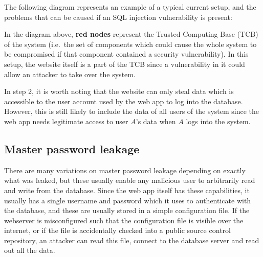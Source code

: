 \documentclass{report}
\begin{document}
The following diagram represents an example of a typical current setup, and the problems that can be caused if an SQL injection vulnerability is present:

\begin{center}
\end{center}

In the diagram above, \textbf{red nodes} represent the Trusted Computing Base (TCB) of the system (i.e.\ the set of components which could cause the whole system to be compromised if that component contained a security vulnerability). In this setup, the website itself is a part of the TCB since a vulnerability in it could allow an attacker to take over the system.

In step 2, it is worth noting that the website can only steal data which is accessible to the user account used by the web app to log into the database. However, this is still likely to include the data of all users of the system since the web app needs legitimate access to user $A$'s data when $A$ logs into the system.

\subsection{Master password leakage}
There are many variations on master password leakage depending on exactly what was leaked, but these usually enable any malicious user to arbitrarily read and write from the database. Since the web app itself has these capabilities, it usually has a single username and password which it uses to authenticate with the database, and these are usually stored in a simple configuration file. If the webserver is misconfigured such that the configuration file is visible over the internet, or if the file is accidentally checked into a public source control repository, an attacker can read this file, connect to the database server and read out all the data.
\end{document}

